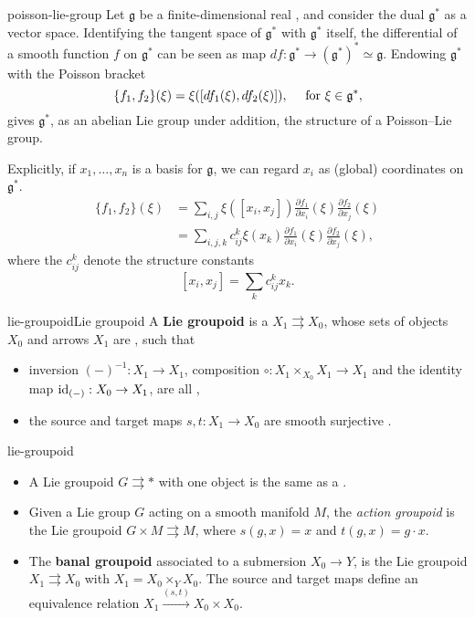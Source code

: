 \begin{example}{poisson-lie-group}
    Let $\mathfrak{g}$ be a finite-dimensional real , and consider the dual $\mathfrak{g}^*$ as a vector space. Identifying the tangent space of $\mathfrak{g}^*$ with $\mathfrak{g}^*$ itself, the differential of a smooth function $f$ on $\mathfrak{g}^*$ can be seen as map $df : \mathfrak{g}^* \to (\mathfrak{g}^*)^* \simeq \mathfrak{g}$. Endowing $\mathfrak{g}^*$ with the Poisson bracket
    \[ \{ f_1, f_2 \}(\xi) = \xi([df_1(\xi), df_2(\xi)]), \quad \textup{ for } \xi \in \mathfrak{g}^* , \]
    gives $\mathfrak{g}^*$, as an abelian Lie group under addition, the structure of a Poisson--Lie group.
    
    Explicitly, if $x_1, \ldots, x_n$ is a basis for $\mathfrak{g}$, we can regard $x_i$ as (global) coordinates on $\mathfrak{g}^*$.
    \[ \begin{aligned}
        \{ f_1, f_2 \}(\xi)
            &= \sum_{i, j} \xi([ x_i, x_j]) \frac{\partial f_1}{\partial x_i}(\xi) \frac{\partial f_2}{\partial x_j} (\xi) \\
            &= \sum_{i, j, k} c_{ij}^k \xi(x_k) \frac{\partial f_1}{\partial x_i}(\xi) \frac{\partial f_2}{\partial x_j} (\xi) ,
    \end{aligned} \]
    where the $c_{ij}^k$ denote the structure constants
    \[ [x_i, x_j] = \sum_k c_{ij}^k x_k . \]
\end{example}

\begin{topic}{lie-groupoid}{Lie groupoid}
    A \textbf{Lie groupoid} is a  $X_1 \rightrightarrows X_0$, whose sets of objects $X_0$ and arrows $X_1$ are , such that
    \begin{itemize}
        \item inversion $(-)^{-1} : X_1 \to X_1$, composition $\circ : X_1 \times_{X_0} X_1 \to X_1$ and the identity map $\text{id}_{(-)} : X_0 \to X_1$, are all ,
        \item the source and target maps $s, t : X_1 \to X_0$ are smooth surjective .
    \end{itemize}
\end{topic}

\begin{example}{lie-groupoid}
    \begin{itemize}
        \item A Lie groupoid $G \rightrightarrows *$ with one object is the same as a .
        \item Given a Lie group $G$ acting on a smooth manifold $M$, the \textit{action groupoid} is the Lie groupoid $G \times M \rightrightarrows M$, where $s(g, x) = x$ and $t(g, x) = g \cdot x$.
        \item The \textbf{banal groupoid} associated to a submersion $X_0 \to Y$, is the Lie groupoid $X_1 \rightrightarrows X_0$ with $X_1 = X_0 \times_Y X_0$. The source and target maps define an equivalence relation $X_1 \xrightarrow{(s, t)} X_0 \times X_0$.
    \end{itemize}
\end{example}
